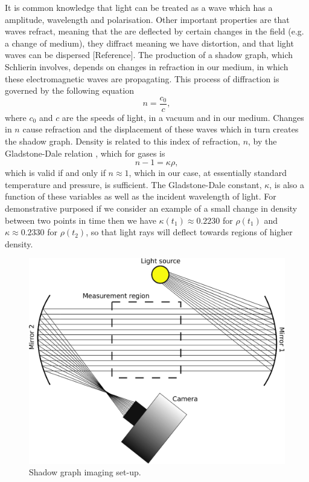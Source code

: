 \documentclass[a4paper,10pt,twoside]{article}
\begin{document}
\begin{multicols}{2}
It is common knowledge that light can be treated as a wave which has a amplitude, wavelength and polarisation. Other important properties are that waves refract, meaning that the are deflected by certain changes in the field (e.g. a change of medium), they diffract meaning we have distortion, and that light waves can be dispersed [Reference]. The production of a shadow graph, which Schlierin involves, depends on changes in refraction in our medium, in which these electromagnetic waves are propagating. This process of diffraction is governed by the following equation
\begin{equation}
    n = \frac{c_0}{c},
\end{equation}
where $c_0$ and $c$ are the speeds of light, in a vacuum and in our medium. Changes in $n$ cause refraction and the displacement of these waves which in turn creates the shadow graph. Density is related to this index of refraction, $n$, by the Gladstone-Dale relation \cite{2}, which for gases is 
\begin{equation}
    n -1 = \kappa \rho,
\end{equation}
which is valid if and only if $n \approx 1$, which in our case, at essentially standard temperature and pressure, is sufficient. The Gladstone-Dale constant, $\kappa$, is also a function of these variables as well as the incident wavelength of light. For demonstrative purposed if we consider an example of a small change in density between two points in time then we have $\kappa(t_1) \approx 0.2230$ for $\rho(t_1)$ and $\kappa \approx 0.2330$ for $\rho(t_2)$, so that light rays will deflect towards regions of higher density.  \par 



\begin{figure}[H]
    \centering
    \includegraphics[width=\linewidth]{SI.eps}
    \caption{Shadow graph imaging set-up.}
    \label{fig:my_label}
\end{figure}





\end{multicols}
\end{document}
